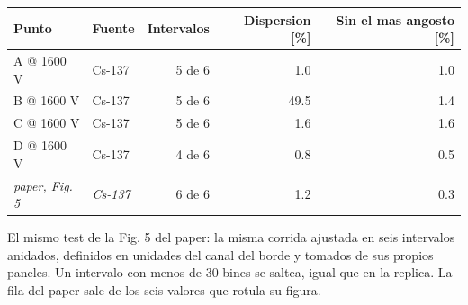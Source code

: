 \begin{tabular}{llrrr}
\toprule
\textbf{Punto} & \textbf{Fuente} & \textbf{Intervalos} & \textbf{Dispersion [\%]} & \textbf{Sin el mas angosto [\%]} \\
\midrule
A @ 1600 V & Cs-137 & 5 de 6 & 1.0 & 1.0 \\
B @ 1600 V & Cs-137 & 5 de 6 & 49.5 & 1.4 \\
C @ 1600 V & Cs-137 & 5 de 6 & 1.6 & 1.6 \\
D @ 1600 V & Cs-137 & 4 de 6 & 0.8 & 0.5 \\
\midrule
\textit{paper, Fig. 5} & \textit{Cs-137} & 6 de 6 & 1.2 & 0.3 \\
\bottomrule
\end{tabular}
\par\smallskip
\begin{minipage}{0.95\linewidth}\footnotesize El mismo test de la Fig. 5 del paper: la misma corrida ajustada en seis intervalos anidados, definidos en unidades del canal del borde y tomados de sus propios paneles. Un intervalo con menos de 30 bines se saltea, igual que en la replica. La fila del paper sale de los seis valores que rotula su figura.\end{minipage}
